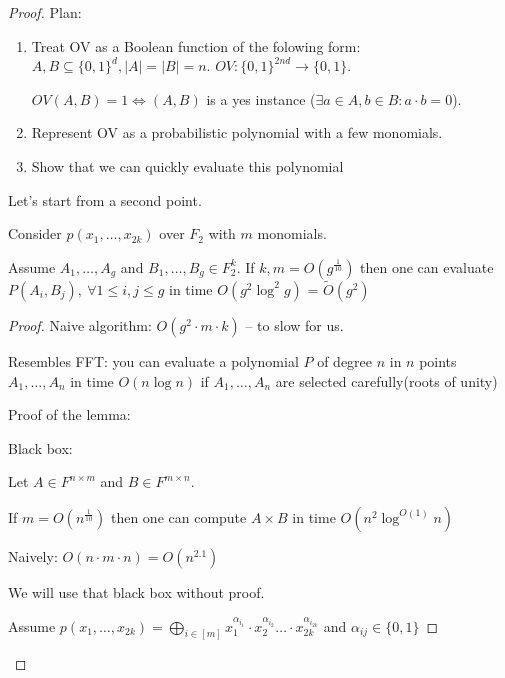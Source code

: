 \begin{proof}
	Plan:
	\begin{enumerate}
		\item Treat OV as a Boolean function of the folowing form: $A, B \subseteq \{0, 1\}^d, |A| = |B| = n$.
			$OV : \{0, 1\}^{2nd} \to \{0, 1\}$.

			$OV(A, B) = 1 \Longleftrightarrow (A, B)$ is a yes instance ($\exists a \in A, b \in B : a \cdot b = 0$).

		\item Represent OV as a probabilistic polynomial with a few monomials.
		\item Show that we can quickly evaluate this polynomial
	\end{enumerate}

	Let's start from a second point.


	\begin{lm}
		Consider $p(x_1, \dots, x_{2k})$ over $F_2$ with $m$ monomials.

		Assume $A_1, \dots, A_g$ and $B_1, \dots, B_g \in F_2^k$.
		If $k, m = O(g^{\frac{1}{10}})$ then one can evaluate $P(A_i, B_j) ,\ \forall 1 \leq i, j \leq g$ in time $O(g^2 \log^2g)$ = $\widetilde{O}(g^2)$
	\end{lm}

	\begin{proof}
		Naive algorithm: $O(g^2 \cdot m \cdot k)$ -- to slow for us.

		\begin{remrk*}
			Resembles FFT: you can evaluate a polynomial $P$ of degree $n$ in $n$ points $A_1, \dots, A_n$ in time $O(n \log n)$ if $A_1, \dots, A_n$ are selected carefully(roots of unity)
		\end{remrk*}

		Proof of the lemma:

		Black box:
		\begin{thm}[Coopersmith, 198?]
			Let $A \in F^{n \times m}$ and $B \in F^{m \times n}$.

			If $m = O(n^{\frac{1}{10}})$ then one can compute $A \times B$ in time $O(n^2 \log ^{O(1)} n)$

			Naively: $O(n \cdot m \cdot n) = O(n^{2.1})$
		\end{thm}

		We will use that black box without proof.

		Assume $p(x_1, \dots ,x_{2k}) = \bigoplus_{i \in [m]} x_1^{\alpha_{i_1}} \cdot x_2^{\alpha_{i_2}} \dots \cdot x_{2k}^{\alpha_{i_{2k}}}$ and $\alpha_{i j} \in \{0, 1\}$


\end{proof}
\end{proof}
